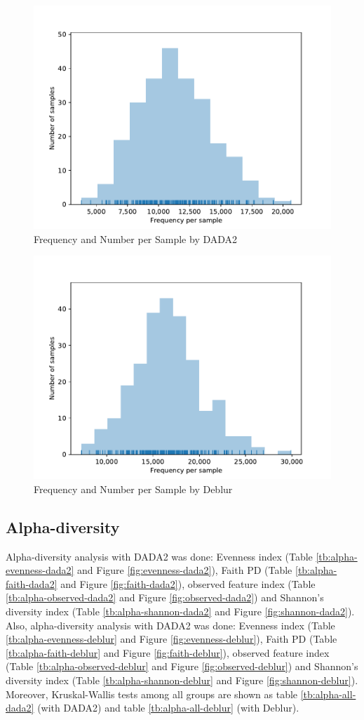 \documentclass[a4paper]{article}
\begin{document}
            \begin{figure}[p]
                \centering
                \includegraphics[width=0.6 \linewidth]{figures/Rarefaction/DADA.pdf}
                \caption{Frequency and Number per Sample by DADA2}
                \label{fig:frequency-sample-dada2}
            \end{figure}

            \begin{figure}[p]
                \centering
                \includegraphics[width=0.6 \linewidth]{figures/Rarefaction/Deblur.pdf}
                \caption{Frequency and Number per Sample by Deblur}
                \label{fig:frequency-sample-deblur}
            \end{figure}

        \subsection{Alpha-diversity}
            Alpha-diversity analysis with DADA2 was done: Evenness index (Table \ref{tb:alpha-evenness-dada2} and Figure \ref{fig:evenness-dada2}), Faith PD (Table \ref{tb:alpha-faith-dada2} and Figure \ref{fig:faith-dada2}), observed feature index (Table \ref{tb:alpha-observed-dada2} and Figure \ref{fig:observed-dada2}) and Shannon's diversity index (Table \ref{tb:alpha-shannon-dada2} and Figure \ref{fig:shannon-dada2}). Also, alpha-diversity analysis with DADA2 was done: Evenness index (Table \ref{tb:alpha-evenness-deblur} and Figure \ref{fig:evenness-deblur}), Faith PD (Table \ref{tb:alpha-faith-deblur} and Figure \ref{fig:faith-deblur}), observed feature index (Table \ref{tb:alpha-observed-deblur} and Figure \ref{fig:observed-deblur}) and Shannon's diversity index (Table \ref{tb:alpha-shannon-deblur} and Figure \ref{fig:shannon-deblur}). Moreover, Kruskal-Wallis tests among all groups are shown as table \ref{tb:alpha-all-dada2} (with DADA2) and table \ref{tb:alpha-all-deblur} (with Deblur).
\end{document}
